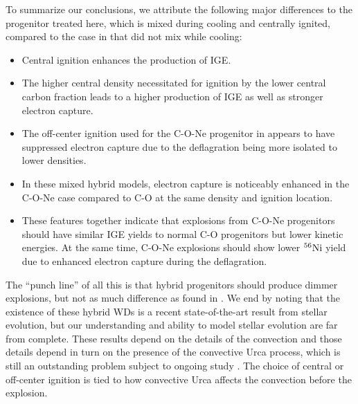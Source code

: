 \documentclass[preprint2]{aastex63}
\newcommand{\Ni}[1]{\ensuremath{{}^{#1}{\rm Ni}}}
\newcommand{\code}[1]{\textsc{#1}}
\newcommand{\CASTRO}{\code{CASTRO}}
\begin{document}
To summarize our conclusions, we attribute the following major differences to the progenitor treated here, 
which is mixed during cooling and centrally ignited, compared to the case in \citet{willcoxetal2016} 
that did not mix while cooling:

\begin{itemize}

\item
Central ignition enhances the production of IGE.

\item
The higher central density necessitated for ignition by the lower central carbon fraction leads to a higher production of IGE as well as stronger electron capture.

\item
The off-center ignition used for the C-O-Ne progenitor in \citet{willcoxetal2016} appears to have suppressed electron capture due to the deflagration being more isolated to lower densities.

\item
In these mixed hybrid models, electron capture is noticeably enhanced in the C-O-Ne case compared to C-O at the same density and ignition location.

\item
These features together indicate that explosions from C-O-Ne progenitors should have similar IGE yields to normal C-O progenitors but lower kinetic energies.
At the same time, C-O-Ne explosions should show lower \Ni{56} yield due to enhanced electron capture during the deflagration.

\end{itemize}

The ``punch line'' of all this is that hybrid progenitors should produce dimmer
explosions, but not as much difference as found in \citet{willcoxetal2016}.
We end by noting that the existence of these hybrid
WDs is a recent state-of-the-art result from stellar evolution, but our understanding 
and ability to model stellar evolution are far from complete. These results depend
on the details of the convection and those details depend in turn on the
presence of the convective Urca process, which is still an outstanding problem 
subject to ongoing study \citep{calderetal2019,willcoxetal2019}.
The choice of central or off-center ignition is tied to how convective Urca affects the convection before the explosion.

\end{document}

